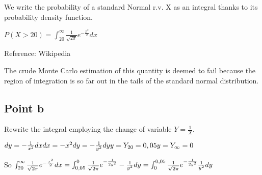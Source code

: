 \documentclass[
]{article}
\begin{document}
We write the probability of a standard Normal r.v. X as an integral
thanks to its probability density function.

\(P(X>20)=\int_{20}^\infty \frac{1}{\sqrt{2\pi}} e^{-\frac{x^{2}}{2}} dx\)

Reference: Wikipedia

The crude Monte Carlo estimation of this quantity is deemed to fail
because the region of integration is so far out in the tails of the
standard normal distribution.

\hypertarget{point-b}{%
\subsection{Point b}\label{point-b}}

Rewrite the integral employing the change of variable
\(Y = \frac{1}{X}\).

\(dy=-\frac{1}{x^{2}} dx\\dx=-x^{2}dy=-\frac{1}{y^{2}}dy\\y=Y_{20}=0,05\\y=Y_\infty=0\)

So
\(\int_{20}^\infty \frac{1}{\sqrt{2\pi}} e^{-\frac{x^{2}}{2}} dx\\=\int_{0,05}^0 \frac{1}{\sqrt{2\pi}} e^{-\frac{1}{2y^{2}}} -\frac{1}{y^2} dy \\=\int_0^{0,05} \frac{1}{\sqrt{2\pi}} e^{-\frac{1}{2y^{2}}} \frac{1}{y^2} dy\)
\end{document}
